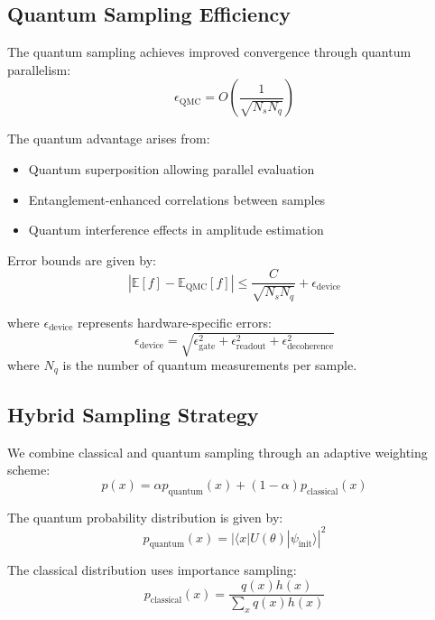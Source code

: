 \documentclass{article}
\begin{document}
\subsection{Quantum Sampling Efficiency}
The quantum sampling achieves improved convergence through quantum parallelism:
\begin{equation}
\epsilon_{\text{QMC}} = O\left(\frac{1}{\sqrt{N_s N_q}}\right)
\end{equation}

The quantum advantage arises from:
\begin{itemize}
\item Quantum superposition allowing parallel evaluation
\item Entanglement-enhanced correlations between samples
\item Quantum interference effects in amplitude estimation
\end{itemize}

Error bounds are given by:
\begin{equation}
|\mathbb{E}[f] - \mathbb{E}_{\text{QMC}}[f]| \leq \frac{C}{\sqrt{N_s N_q}} + \epsilon_{\text{device}}
\end{equation}

where $\epsilon_{\text{device}}$ represents hardware-specific errors:
\begin{equation}
\epsilon_{\text{device}} = \sqrt{\epsilon_{\text{gate}}^2 + \epsilon_{\text{readout}}^2 + \epsilon_{\text{decoherence}}^2}
\end{equation}
where $N_q$ is the number of quantum measurements per sample.

\subsection{Hybrid Sampling Strategy}
We combine classical and quantum sampling through an adaptive weighting scheme:
\begin{equation}
p(x) = \alpha p_{\text{quantum}}(x) + (1-\alpha)p_{\text{classical}}(x)
\end{equation}

The quantum probability distribution is given by:
\begin{equation}
p_{\text{quantum}}(x) = |\langle x|U(\theta)|\psi_{\text{init}}\rangle|^2
\end{equation}

The classical distribution uses importance sampling:
\begin{equation}
p_{\text{classical}}(x) = \frac{q(x)h(x)}{\sum_x q(x)h(x)}
\end{equation}
\end{document}
